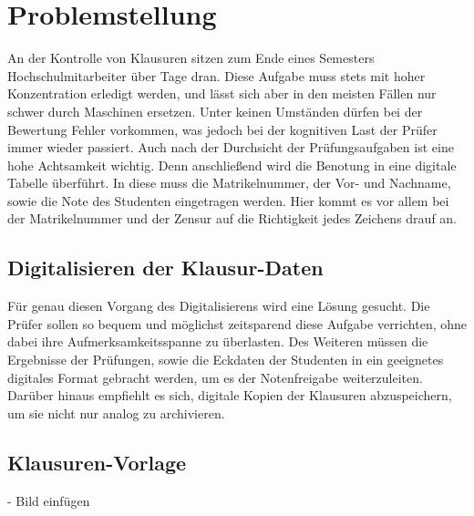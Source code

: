 \documentclass[nomenclature, oneside, 150]{HSMW-Thesis}
\begin{document}

\chapter{Problemstellung} 
	An der Kontrolle von Klausuren sitzen zum Ende eines Semesters Hochschulmitarbeiter über Tage dran. Diese Aufgabe muss stets mit hoher Konzentration erledigt werden, und lässt sich aber in den meisten Fällen nur schwer durch Maschinen ersetzen. Unter keinen Umständen dürfen bei der Bewertung Fehler vorkommen, was jedoch bei der kognitiven Last der Prüfer immer wieder passiert. Auch nach der Durchsicht der Prüfungsaufgaben ist eine hohe Achtsamkeit wichtig. Denn anschließend wird die Benotung in eine digitale Tabelle überführt. In diese muss die Matrikelnummer, der Vor- und Nachname, sowie die Note des Studenten eingetragen werden. Hier kommt es vor allem bei der Matrikelnummer und der Zensur auf die Richtigkeit jedes Zeichens drauf an. 
	
	\section{Digitalisieren der Klausur-Daten}
	Für genau diesen Vorgang des Digitalisierens wird eine Lösung gesucht. Die Prüfer sollen so bequem und möglichst zeitsparend diese Aufgabe verrichten, ohne dabei ihre Aufmerksamkeitsspanne zu überlasten. Des Weiteren müssen die Ergebnisse der Prüfungen, sowie die Eckdaten der Studenten in ein geeignetes digitales Format gebracht werden, um es der Notenfreigabe weiterzuleiten. Darüber hinaus empfiehlt es sich, digitale Kopien der Klausuren abzuspeichern, um sie nicht nur analog zu archivieren.
	
	\section{Klausuren-Vorlage}
	
	- Bild einfügen
	
\end{document}
